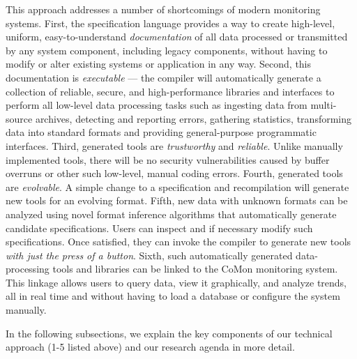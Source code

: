 This approach addresses a number of shortcomings of modern monitoring
systems.  First, the \pads{} specification language provides a 
way to create high-level, uniform, easy-to-understand {\em documentation}
of all data processed or transmitted by any system component, 
including legacy components, without having to modify or alter existing
systems or
application in any way.  Second, this documentation is 
{\em executable} --- the
\pads{} compiler will automatically generate a collection of
reliable, secure, and high-performance libraries and interfaces
to perform all low-level data processing tasks such as ingesting
data from multi-source archives, detecting and reporting
errors, gathering statistics, 
transforming data into standard formats and providing
general-purpose programmatic interfaces.  Third, generated
tools are {\em trustworthy} and {\em reliable}. Unlike manually 
implemented tools, there will be no security vulnerabilities caused by
buffer overruns or other such low-level, manual coding errors.
Fourth, generated tools are {\em evolvable}. A simple change to
a specification and recompilation will generate new tools for
an evolving format.  Fifth, new data with unknown formats can be analyzed
using novel format inference algorithms that automatically generate
candidate specifications.  Users can inspect and if necessary modify
such specifications. Once satisfied, they can invoke the \pads{}
compiler to generate new tools {\em with just the press of a button}.
Sixth, such automatically generated data-processing tools and libraries 
can be linked to the CoMon monitoring
system.  This linkage allows users to query
data, view it graphically, and analyze trends, all in real
time and without having to load a database or configure the system manually.



In the following subsections, we explain the key components of
our technical approach (1-5 listed above) and our research agenda in 
more detail.
